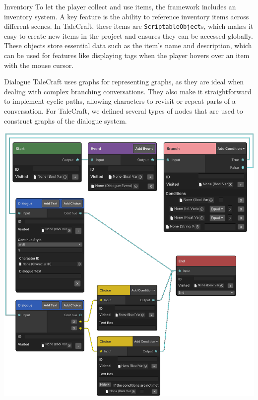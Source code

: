 \documentclass[portrait,a0paper,fontscale=0.35]{baposter}
\begin{document}
\begin{poster}
\begin{posterbox}[column=1, span=1, name=is]{Inventory}
To let the player collect and use items, the framework includes an inventory system. A key feature is the ability to reference inventory items across different scenes. In TaleCraft, these items are \verb|ScriptableObject|s, which makes it easy to create new items in the project and ensures they can be accessed globally. These objects store essential data such as the item's name and description, which can be used for features like displaying tags when the player hovers over an item with the mouse cursor.
\end{posterbox}

\begin{posterbox}[column=1, span=1, name=ds, below=is, %
]{Dialogue}
TaleCraft uses graphs for representing graphs, as they are ideal when dealing with complex branching conversations. They also make it straightforward to implement cyclic paths, allowing characters to revisit or repeat parts of a conversation. For TaleCraft, we defined several types of nodes that are used to construct graphs of the dialogue system.

\begin{center}
\includegraphics[width=0.7\linewidth]{img/nodes.png}
\end{center}

\end{posterbox}



\end{poster}
\end{document}
